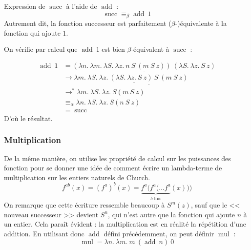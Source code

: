 \documentclass[11pt]{article}
\begin{document}
\begin{theorem}
    Expression de $\operatorname{succ}$ à l'aide de $\operatorname{add}$ :
    $$\operatorname{succ}\equiv_\beta \operatorname{add}~1$$
    Autrement dit, la fonction successeur est parfaitement ($\beta$-)équivalente à la fonction qui ajoute 1.

    \begin{preuve}
        On vérifie par calcul que $\operatorname{add}~1$ est bien $\beta$-équivalent à $\operatorname{succ}$ :

        \begin{equation*}
        \begin{aligned}
            \operatorname{add}~1&=\underline{\left(\lambda n.~\lambda m.~\lambda S.~\lambda z.~n~S~(m~S~z)\right)~\left(\lambda S.~\lambda z.~ S~z\right)}\\
            &\longrightarrow \lambda m.~\lambda S.~\lambda z.~\underline{\underline{\left(\lambda S.~\lambda z.~ S~z\right)~S}~(m~S~z)}\\
            &\longrightarrow^* \lambda m.~\lambda S.~\lambda z.~S (m~S~z)\\
            &\equiv_\alpha \lambda n.~\lambda S.~\lambda z.~S (n~S~z)\\
            &= \operatorname{succ}
        \end{aligned}
        \end{equation*}
        D'où le résultat.
    \end{preuve}
\end{theorem}

\subsubsection{Multiplication}

De la même manière, on utilise les propriété de calcul sur les puissances des fonction pour se donner une idée de comment écrire un lambda-terme de multiplication sur les entiers naturels de Church.
$$f^{ab}(x)=\left(f^a\right)^b(x)=\underbrace{f^a(f^a(\dots f^a}_\text{$b$ fois}(x)))$$
On remarque que cette écriture ressemble beaucoup à $S^m(z)$, sauf que le << nouveau successeur >> devient $S^n$, qui n'est autre que la fonction qui ajoute $n$ à un entier. Cela paraît évident : la multiplication est en réalité la répétition d'une addition. En utilisant donc $\operatorname{add}$ défini précédemment, on peut définir $\operatorname{mul}$ :
$$\operatorname{mul} = \lambda n.~\lambda m.~m~(\operatorname{add}~n)~0$$
\end{document}
